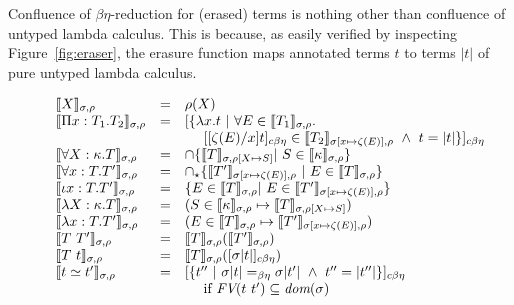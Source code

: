 \documentclass{article}
\newcommand{\choice}[0]{\zeta}
\newcommand{\elcap}[0]{\cap}
\newcommand{\interp}[1]{\llbracket #1 \rrbracket}
\newcommand{\cbe}[0]{c\beta\eta}
\newtheorem{lemma}[theorem]{Lemma}
\begin{document}
  Confluence of $\beta\eta$-reduction for (erased)
  terms is nothing other than confluence of untyped lambda calculus.
  This is because, as easily verified by inspecting
  Figure~\ref{fig:eraser}, the erasure function maps annotated terms
  $t$ to terms $|t|$ of pure untyped lambda calculus.
\begin{comment}
  \begin{lemma}
    If $t$ is an annotated term of CDLE, then $|t|$ is a term of pure untyped lambda calculus.
    \end{lemma}
\end{comment}    

\begin{figure}
\[
\begin{array}{lll}
\interp{X}_{\sigma,\rho} & = & \rho(X) \\ 
\interp{\Pi x : T_1. T_2}_{\sigma,\rho} & = & 
    [\{ \lambda x.t\ |\ \forall E\in\interp{T_1}_{\sigma,\rho}.\\
\ &\ &\ \ \ \  [[\choice(E)/x]t]_{\cbe}\in\interp{T_2}_{\sigma[x\mapsto \choice(E)],\rho} \ \wedge\ t = |t|\}]_{\cbe}
 \\
\interp{\forall X:\kappa.T}_{\sigma,\rho} & = & 
  \elcap \{ \interp{T}_{\sigma,\rho[X\mapsto S]} |\ S\in\interp{\kappa}_{\sigma,\rho} \}  \\ 
\interp{\forall x:T.T'}_{\sigma,\rho} & = & 
  \elcap_\star \{ \interp{T'}_{\sigma[x\mapsto \choice(E)],\rho}\ |\ E\in\interp{T}_{\sigma,\rho} \} \\ 
\interp{\iota x:T.T'}_{\sigma,\rho} & = & \{ E\in\interp{T}_{\sigma,\rho} |\ E \in \interp{T'}_{\sigma[x\mapsto \choice(E)],\rho} \} \\ 
\interp{\lambda X:\kappa.T}_{\sigma,\rho} & = & (S\in\interp{\kappa}_{\sigma,\rho} \mapsto \interp{T}_{\sigma,\rho[X\mapsto S]}) 
\\ 
\interp{\lambda x:T.T'}_{\sigma,\rho} & = & 
    (E\in\interp{T}_{\sigma,\rho} \mapsto \interp{T'}_{\sigma[x\mapsto \choice(E)],\rho}) 
\\ 
\interp{T\ T'}_{\sigma,\rho} & = & \interp{T}_{\sigma,\rho}(\interp{T'}_{\sigma,\rho})
\\ 
\interp{T\ t}_{\sigma,\rho} & = & \interp{T}_{\sigma,\rho}([\sigma |t|]_{\cbe})
\\
\interp{t \simeq t'}_{\sigma,\rho} & = & [\{ t''\ |\ \sigma |t| =_{\beta\eta} \sigma |t'|\ \wedge\ t'' = |t''| \}]_{\cbe} \\
\ &\ &\ \ \ \textnormal{ if }\textit{FV}(t\ t')\subseteq\textit{dom}(\sigma) 
\\

\end{array}\]
\end{figure}
\end{document}
